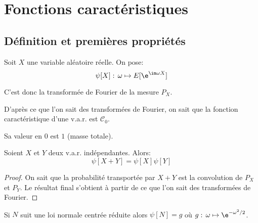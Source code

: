 \section{Fonctions caractéristiques}

\subsection{Définition et premières propriétés}

\begin{de}
Soit $X$ une variable aléatoire réelle. On pose:
\[
\psi[X]: \, \omega \mapsto E[\e^{\im \omega X}]
\]

C'est donc la transformée de Fourier de la mesure $P_X$.
\end{de}

\begin{listremarques}
\item
D'après ce que l'on sait des transformées de Fourier, on sait que la fonction caractéristique d'une v.a.r. est $\mathcal{C}_0$.
\item
Sa valeur en $0$ est $1$ (masse totale).
\end{listremarques}


\begin{prop}
Soient $X$ et $Y$ deux v.a.r. indépendantes. Alors:
\[
\psi[X+Y] = \psi[X] \psi[Y]
\]
\end{prop}

\begin{proof}
On sait que la probabilité transportée par $X+Y$ est la convolution de $P_X$ et $P_Y$. Le résultat final s'obtient à partir de ce que l'on sait des transformées de Fourier.
\end{proof}


\begin{prop}
Si $N$ suit une loi normale centrée réduite alors $\psi[N] = g$ où $g: \, \omega \mapsto \e^{-\omega^2/2}$.
\end{prop}

